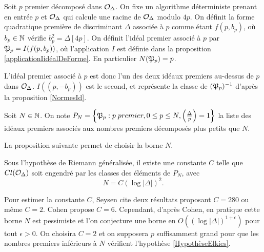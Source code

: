 \begin{Def}
	Soit $p$ premier décomposé dans $\mathcal{O}_{\Delta}$. On fixe un algorithme déterministe prenant en entrée $p$ et $\mathcal{O}_{\Delta}$ qui calcule une racine de $\mathcal{O}_{\Delta}$ modulo $4p$. On définit la forme quadratique première de discriminant $\Delta$ associée à $p$ comme étant $f(p,b_{p})$, où $b_{p}\in\mathbb{N}$ vérifie $b_{p}^2 = \Delta [4p]$. On définit l'idéal premier associé à $p$ par $\mathfrak{P}_{p} = I(f(p,b_{p}))$, où l'application $I$ est définie dans la proposition \ref{applicationIidéalDeForme}. En particulier $N(\mathfrak{P}_{p}) = p$.
\end{Def}

\begin{Rem}
	L'idéal premier associé à $p$ est donc l'un des deux idéaux premiers au-dessus de $p$ dans $\mathcal{O}_{\Delta}$. $I((p,-b_{p}))$ est le second, et représente la classe de $(\mathfrak{P}_{p})^{-1}$ d'après la proposition \ref{NormesId}. 
\end{Rem}

\begin{Def}
	Soit $N\in\mathbb{N}$. On note $P_{N} = \left\lbrace \mathfrak{P}_{p} : p \; premier, 0\leq p\leq N, \left( \frac{\Delta}{p}\right) = 1\right\rbrace$ la liste des idéaux premiers associés aux nombres premiers décomposés plus petits que $N$. 
\end{Def}

La proposition suivante permet de choisir la borne $N$.

\begin{Prop}\label{BorneThéorique}
	
	Sous l'hypothèse de Riemann généralisée, il existe une constante $C$ telle que $Cl(\mathcal{O}_{\Delta})$ soit engendré par les classes des éléments de $P_{N}$, avec 
	\begin{equation*}
		N = C\left( \log |\Delta| \right) ^{2}.
	\end{equation*}
	
\end{Prop}

\begin{Rem}
	Pour estimer la constante $C$, Seysen \cite{Seysen} cite deux résultats proposant $C= 280$ ou même $C = 2$. Cohen \cite{Coh00} propose $C = 6$. Cependant, d'après Cohen, en pratique cette borne $N$ est pessimiste et l'on conjecture une borne en $O\left( (\log |\Delta|)^{1+\epsilon}\right) $ pour tout $\epsilon > 0$. On choisira $C=2$ et on supposera $p$ suffisamment grand pour que les nombres premiers inférieurs à $N$ vérifient l'hypothèse \ref{HypothèseElkies}.
\end{Rem}


